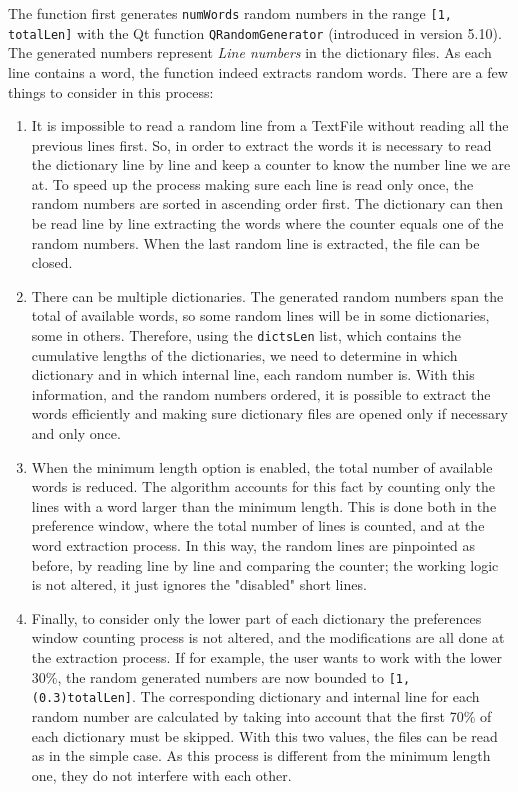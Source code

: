 The function first generates \texttt{numWords} random numbers in the range \texttt{[1, totalLen]} with the Qt function \texttt{QRandomGenerator} (introduced in version 5.10). The generated numbers represent \textsl{Line numbers} in the dictionary files. As each line contains a word, the function indeed extracts random words. There are a few things to consider in this process:
\begin{enumerate}
\setlength\itemsep{-3pt}

\item It is impossible to read a random line from a TextFile without reading all the previous lines first. So, in order to extract the words it is necessary to read the dictionary line by line and keep a counter to know the number line we are at. To speed up the process making sure each line is read only once, the random numbers are sorted in ascending order first. The dictionary can then be read line by line extracting the words where the counter equals one of the random numbers. When the last random line is extracted, the file can be closed.

\item There can be multiple dictionaries. The generated random numbers span the total of available words, so some random lines will be in some dictionaries, some in others. Therefore, using the \texttt{dictsLen} list, which contains the cumulative lengths of the dictionaries, we need to determine in which dictionary and in which internal line, each random number is. With this information, and the random numbers ordered, it is possible to extract the words efficiently and making sure dictionary files are opened only if necessary and only once.

\item When the minimum length option is enabled, the total number of available words is reduced. The algorithm accounts for this fact by counting only the lines with a word larger than the minimum length. This is done both in the preference window, where the total number of lines is counted, and at the word extraction process. In this way, the random lines are pinpointed as before, by reading line by line and comparing the counter; the working logic is not altered, it just ignores the "disabled" short lines.

\item Finally, to consider only the lower part of each dictionary the preferences window counting process is not altered, and the modifications are all done at the extraction process. If for example, the user wants to work with the lower 30\%, the random generated numbers are now bounded to \texttt{[1,  (0.3)totalLen]}. The corresponding dictionary and internal line for each random number are calculated by taking into account that the first 70\% of each dictionary must be skipped. With this two values, the files can be read as in the simple case. As this process is different from the minimum length one, they do not interfere with each other.

\end{enumerate}

